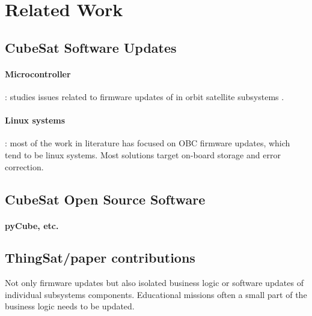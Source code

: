 \section{Related Work}
\label{sec:background-related-work}

\subsection{CubeSat Software Updates}
\label{sec:fu-cubesat}
\paragraph*{Microcontroller}: studies issues related to firmware updates of in
orbit satellite subsystems \cite{sunter2016updatesnano}.
\paragraph*{Linux systems}: most of the work in literature has focused on OBC firmware
updates, which tend to be linux systems. Most solutions target on-board storage
and error correction. \cite{FitzsimmonsReliableSoftwareUpdates}

\subsection{CubeSat Open Source Software}
\label{sec:open-source-cubesat}
\paragraph*{pyCube, etc.}



\subsection{ThingSat/paper contributions} 
Not only firmware updates but also isolated business
logic or software updates of individual subsystems components. Educational missions
often a small part of the business logic needs to be updated.
